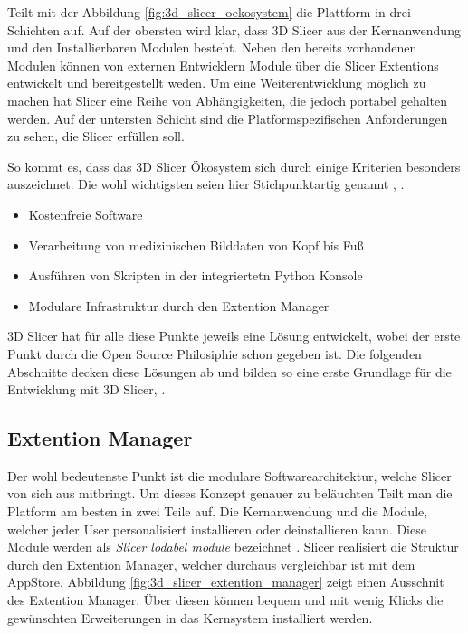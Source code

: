 \citet[Seite 1326]{fedorov2012slicer} Teilt mit der Abbildung
\ref{fig:3d_slicer_oekosystem} die Plattform in drei Schichten auf. Auf der obersten
wird klar, dass 3D Slicer aus der Kernanwendung und den Installierbaren Modulen
besteht. Neben den bereits vorhandenen Modulen können von externen Entwicklern Module
über die Slicer Extentions entwickelt und bereitgestellt weden. Um eine
Weiterentwicklung möglich zu machen hat Slicer eine Reihe von Abhängigkeiten, die
jedoch portabel gehalten werden. Auf der untersten Schicht sind die
Platformspezifischen Anforderungen zu sehen, die Slicer erfüllen soll.

So kommt es, dass das 3D Slicer Ökosystem sich durch einige Kriterien besonders
auszeichnet. Die wohl wichtigsten seien hier Stichpunktartig genannt \citep[vgl.][]{slicer2024},
\citep[vgl.][]{fedorov2012slicer}.

\begin{itemize}
	\item Kostenfreie Software

	\item Verarbeitung von medizinischen Bilddaten von Kopf bis Fuß

	\item Ausführen von Skripten in der integriertetn Python Konsole

	\item Modulare Infrastruktur durch den Extention Manager
\end{itemize}

3D Slicer hat für alle diese Punkte jeweils eine Lösung entwickelt, wobei der
erste Punkt durch die Open Source Philosiphie schon gegeben ist. Die folgenden Abschnitte
decken diese Lösungen ab und bilden so eine erste Grundlage für die Entwicklung mit
3D Slicer\citep[vgl.][]{slicer2024}, \citep[vgl.][]{fedorov2012slicer}.

\subsection{Extention Manager}
Der wohl bedeutenste Punkt ist die modulare Softwarearchitektur, welche Slicer
von sich aus mitbringt. Um dieses Konzept genauer zu beläuchten Teilt man die Platform
am besten in zwei Teile auf. Die Kernanwendung und die Module, welcher jeder User
personalisiert installieren oder deinstallieren kann. Diese Module werden als
\textit{Slicer lodabel module} bezeichnet \citep[vgl.][Seite 1332]{fedorov2012slicer}.
Slicer realisiert die Struktur durch den Extention Manager, welcher durchaus vergleichbar
ist mit dem AppStore. Abbildung \ref{fig:3d_slicer_extention_manager} zeigt
einen Ausschnit des Extention Manager. Über diesen können bequem und mit wenig Klicks
die gewünschten Erweiterungen in das Kernsystem installiert werden.

